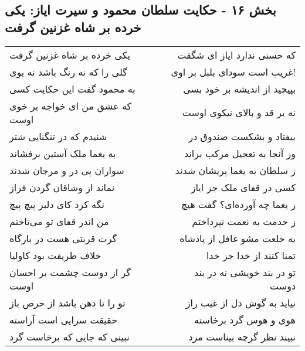\begin{center}
\section*{بخش ۱۶ - حکایت سلطان محمود و سیرت ایاز: یکی خرده بر شاه غزنین گرفت}
\label{sec:016}
\begin{longtable}{l p{0.5cm} r}
یکی خرده بر شاه غزنین گرفت
&&
که حسنی ندارد ایاز ای شگفت
\\
گلی را که نه رنگ باشد نه بوی
&&
غریب است سودای بلبل بر اوی!
\\
به محمود گفت این حکایت کسی
&&
بپیچید از اندیشه بر خود بسی
\\
که عشق من ای خواجه بر خوی اوست
&&
نه بر قد و بالای نیکوی اوست
\\
شنیدم که در تنگنایی شتر
&&
بیفتاد و بشکست صندوق در
\\
به یغما ملک آستین برفشاند
&&
وز آنجا به تعجیل مرکب براند
\\
سواران پی در و مرجان شدند
&&
ز سلطان به یغما پریشان شدند
\\
نماند از وشاقان گردن فراز
&&
کسی در قفای ملک جز ایاز
\\
نگه کرد کای دلبر پیچ پیچ
&&
ز یغما چه آورده‌ای؟ گفت هیچ
\\
من اندر قفای تو می‌تاختم
&&
ز خدمت به نعمت نپرداختم
\\
گرت قربتی هست در بارگاه
&&
به خلعت مشو غافل از پادشاه
\\
خلاف طریقت بود کاولیا
&&
تمنا کنند از خدا جز خدا
\\
گر از دوست چشمت بر احسان اوست
&&
تو در بند خویشی نه در بند دوست
\\
تو را تا دهن باشد از حرص باز
&&
نیاید به گوش دل از غیب راز
\\
حقیقت سرایی است آراسته
&&
هوی و هوس گرد برخاسته
\\
نبینی که جایی که برخاست گرد
&&
نبیند نظر گرچه بیناست مرد
\\
\end{longtable}
\end{center}

